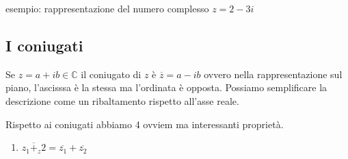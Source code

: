 esempio: rappresentazione del numero complesso $z = 2-3i$


\subsection{I coniugati}
Se $z=a+ib \in \mathbb{C}$ il coniugato di $z$ è $\overline{z} = a-ib$ ovvero nella rappresentazione sul piano, l'ascisssa è la stessa ma l'ordinata è opposta. Possiamo semplificare la descrizione come un ribaltamento rispetto all'asse reale.

Rispetto ai coniugati abbiamo 4 ovviem ma interessanti proprietà.

\begin{enumerate}
    \item $\overline{z_1+_z2}=\overline{z_1}+\overline{z_2}$
\end{enumerate}

